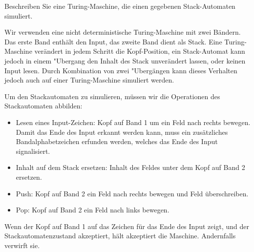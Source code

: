 Beschreiben Sie eine Turing-Maschine, die einen gegebenen Stack-Automaten simuliert.


\begin{loesung}
Wir verwenden eine nicht deterministische Turing-Maschine mit zwei Bändern.
Das erste Band
enthält den Input, das zweite Band dient als Stack. Eine Turing-Maschine
verändert in jedem Schritt die Kopf-Position, ein Stack-Automat kann
jedoch in einem "Ubergang den Inhalt des Stack unverändert lassen,
oder keinen Input lesen. Durch Kombination von zwei "Ubergängen
kann dieses Verhalten jedoch auch auf einer Turing-Maschine simuliert
werden.

Um den Stackautomaten zu simulieren, müssen wir die Operationen des
Stackautomaten abbilden:
\begin{itemize}
\item Lesen eines Input-Zeichen: Kopf auf Band 1 um ein Feld nach
rechts bewegen. Damit das Ende des Input erkannt werden kann, muss ein
zusätzliches Bandalphabetzeichen erfunden werden, welches das Ende
des Input signalisiert.
\item Inhalt auf dem Stack ersetzen: Inhalt des Feldes unter dem Kopf
auf Band 2 ersetzen.
\item Push: Kopf auf Band 2 ein Feld nach rechts bewegen und Feld überschreiben.
\item Pop: Kopf auf Band 2 ein Feld nach links bewegen.
\end{itemize}
Wenn der Kopf auf Band 1 auf das Zeichen für das Ende des Input zeigt,
und der Stackautomatenzustand akzeptiert, hält akzeptiert die Maschine.
Andernfalls verwirft sie.
\end{loesung}
